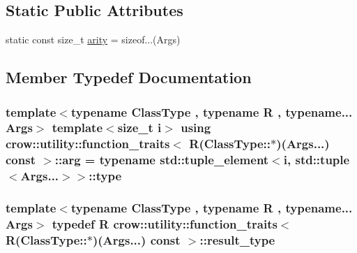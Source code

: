 \subsection*{Static Public Attributes}
\begin{DoxyCompactItemize}
\item 
static const size\-\_\-t \hyperlink{structcrow_1_1utility_1_1function__traits_3_01_r_07_class_type_1_1_5_08_07_args_8_8_8_08_01const_01_01_4_aa415070be54c75d9ffc02d3a2c82c8df}{arity} = sizeof...(Args)
\end{DoxyCompactItemize}


\subsection{Member Typedef Documentation}
\hypertarget{structcrow_1_1utility_1_1function__traits_3_01_r_07_class_type_1_1_5_08_07_args_8_8_8_08_01const_01_01_4_ae00f70f4d6fa347a7b4e010d2eb995c5}{
\subsubsection[{arg}]{\setlength{\rightskip}{0pt plus 5cm}template$<$typename Class\-Type , typename R , typename... Args$>$ template$<$size\-\_\-t i$>$ using {\bf crow\-::utility\-::function\-\_\-traits}$<$ R(Class\-Type\-::$\ast$)(Args...) const  $>$\-::{\bf arg} =  typename std\-::tuple\-\_\-element$<$i, std\-::tuple$<$Args...$>$$>$\-::type}}\label{structcrow_1_1utility_1_1function__traits_3_01_r_07_class_type_1_1_5_08_07_args_8_8_8_08_01const_01_01_4_ae00f70f4d6fa347a7b4e010d2eb995c5}
\hypertarget{structcrow_1_1utility_1_1function__traits_3_01_r_07_class_type_1_1_5_08_07_args_8_8_8_08_01const_01_01_4_ac9c4778b8d2febdb976eb7440a43b118}{
\subsubsection[{result\-\_\-type}]{\setlength{\rightskip}{0pt plus 5cm}template$<$typename Class\-Type , typename R , typename... Args$>$ typedef R {\bf crow\-::utility\-::function\-\_\-traits}$<$ R(Class\-Type\-::$\ast$)(Args...) const  $>$\-::{\bf result\-\_\-type}}}\label{structcrow_1_1utility_1_1function__traits_3_01_r_07_class_type_1_1_5_08_07_args_8_8_8_08_01const_01_01_4_ac9c4778b8d2febdb976eb7440a43b118}


